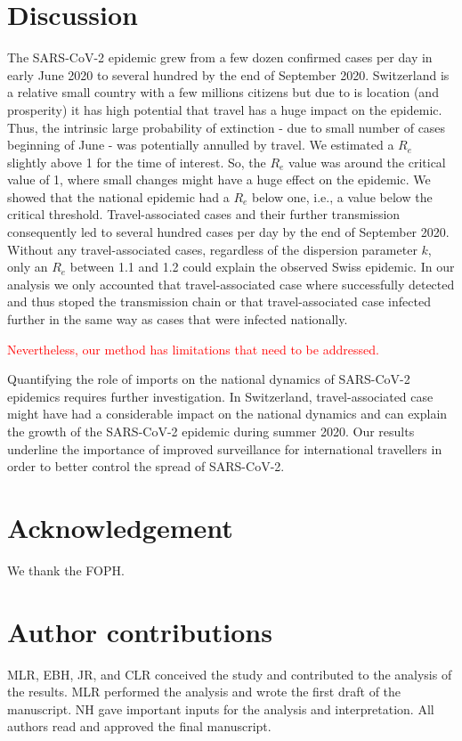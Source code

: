 \documentclass[10pt, a4paper, twoside]{article}
\begin{document}
\begin{multicols}{2}

\section{Discussion}
The SARS-CoV-2 epidemic grew from a few dozen confirmed cases per day in early June 2020 to several hundred by the end of September 2020. Switzerland is a relative small country with a few millions citizens but due to is location (and prosperity) it has high potential that travel has a huge impact on the epidemic. Thus, the intrinsic large probability of extinction - due to small number of cases beginning of June - was potentially annulled by travel. We estimated a $R_e$ slightly above 1 for the time of interest. So, the $R_e$ value was around the critical value of 1, where small changes might have a huge effect on the epidemic. We showed that the national epidemic had a $R_e$ below one, i.e., a value below the critical threshold. Travel-associated cases and their further transmission consequently led to several hundred cases per day by the end of September 2020. Without any travel-associated cases, regardless of the dispersion parameter $k$, only an $R_e$ between 1.1 and 1.2 could explain the observed Swiss epidemic. In our analysis we only accounted that travel-associated case where successfully detected and thus stoped the transmission chain or that travel-associated case infected further in the same way as cases that were infected nationally.

\textcolor{red}{Nevertheless, our method has limitations that need to be addressed.}

Quantifying the role of imports on the national dynamics of SARS-CoV-2 epidemics requires further investigation. In Switzerland, travel-associated case might have had a considerable impact on the national dynamics and can explain the growth of the SARS-CoV-2 epidemic during summer 2020. Our results underline the importance of improved surveillance for international travellers in order to better control the spread of SARS-CoV-2.

\section{Acknowledgement}
We thank the FOPH.

\section{Author contributions}
MLR, EBH, JR, and CLR conceived the study and contributed to the analysis of the results. MLR performed the analysis and wrote the first draft of the manuscript. NH gave important inputs for the analysis and interpretation. All authors read and approved the final manuscript.


\end{multicols}
\end{document}
